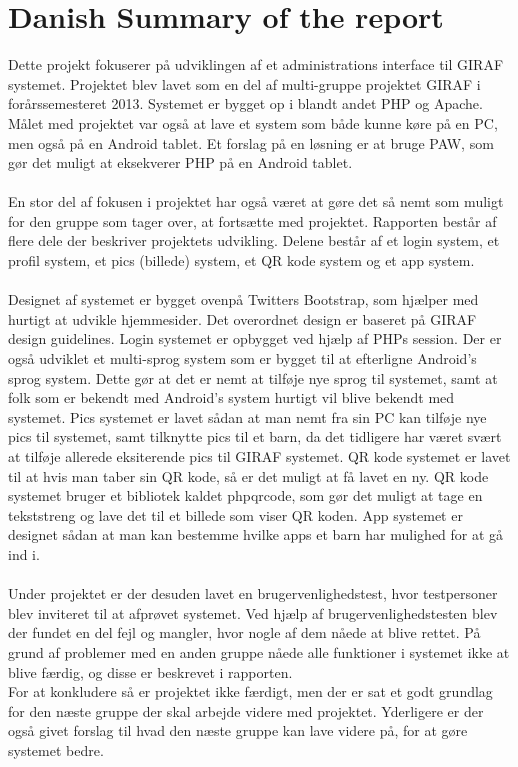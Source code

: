 \section{Danish Summary of the report}
Dette projekt fokuserer på udviklingen af et administrations interface til GIRAF systemet. Projektet blev lavet som en del af multi-gruppe projektet GIRAF i forårssemesteret 2013. Systemet er bygget op i blandt andet PHP og Apache. Målet med projektet var også at lave et system som både kunne køre på en PC, men også på en Android tablet. Et forslag på en løsning er at bruge PAW, som gør det muligt at eksekverer PHP på en Android tablet. \\ \\
En stor del af fokusen i projektet har også været at gøre det så nemt som muligt for den gruppe som tager over, at fortsætte med projektet. Rapporten består af flere dele der beskriver projektets udvikling. Delene består af et login system, et profil system, et pics (billede) system, et QR kode system og et app system. \\ \\
Designet af systemet er bygget ovenpå Twitters Bootstrap, som hjælper med hurtigt at udvikle hjemmesider. Det overordnet design er baseret på GIRAF design guidelines. Login systemet er opbygget ved hjælp af PHPs session. Der er også udviklet et multi-sprog system som er bygget til at efterligne Android's sprog system. Dette gør at det er nemt at tilføje nye sprog til systemet, samt at folk som er bekendt med Android's system hurtigt vil blive bekendt med systemet. Pics systemet er lavet sådan at man nemt fra sin PC kan tilføje nye pics til systemet, samt tilknytte pics til et barn, da det tidligere har været svært at tilføje allerede eksiterende pics til GIRAF systemet. QR kode systemet er lavet til at hvis man taber sin QR kode, så er det muligt at få lavet en ny. QR kode systemet bruger et bibliotek kaldet phpqrcode, som gør det muligt at tage en tekststreng og lave det til et billede som viser QR koden. App systemet er designet sådan at man kan bestemme hvilke apps et barn har mulighed for at gå ind i. \\ \\
Under projektet er der desuden lavet en brugervenlighedstest, hvor testpersoner blev inviteret til at afprøvet systemet. Ved hjælp af brugervenlighedstesten blev der fundet en del fejl og mangler, hvor nogle af dem nåede at blive rettet. På grund af problemer med en anden gruppe nåede alle funktioner i systemet ikke at blive færdig, og disse er beskrevet i rapporten. \\
For at konkludere så er projektet ikke færdigt, men der er sat et godt grundlag for den næste gruppe der skal arbejde videre med projektet. Yderligere er der også givet forslag til hvad den næste gruppe kan lave videre på, for at gøre systemet bedre.